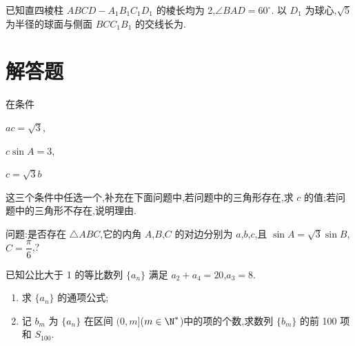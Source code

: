 \begin{problem}
已知直四棱柱 \(ABCD-A_1B_1C_1D_1\) 的棱长均为 2,\(\angle BAD=60^\circ\). 以 \(D_1\) 为球心,\(\sqrt{5}\) 为半径的球面与侧面 \(BCC_1B_1\) 的交线长为\fillinblank{}.
\end{problem}

\section{解答题}

\begin{problem}
在条件
\begin{circlelist}
\item \(ac=\sqrt{3}\),
\item \(c\sin A=3\),
\item \(c=\sqrt{3}b\)
\end{circlelist}
这三个条件中任选一个,补充在下面问题中,若问题中的三角形存在,求 \(c\) 的值;若问题中的三角形不存在,说明理由.

问题:是否存在 \(\triangle ABC\),它的内角 \(A\),\(B\),\(C\) 的对边分别为 \(a\),\(b\),\(c\),且 \(\sin A=\sqrt{3}\sin B\),\(C=\dfrac{\pi}{6}\),\fillinblank{}?
\end{problem}

\begin{problem}
已知公比大于 1 的等比数列 \(\{a_n\}\) 满足 \(a_2+a_4=20\),\(a_3=8\).

\begin{enumerate}
\item 求 \(\{a_n\}\) 的通项公式;
\item 记 \(b_m\) 为 \(\{a_n\}\) 在区间 \((0,m]\)(\(m\in\N^*\))中的项的个数,求数列 \(\{b_m\}\) 的前 100 项和 \(S_{100}\).
\end{enumerate}
\end{problem}

